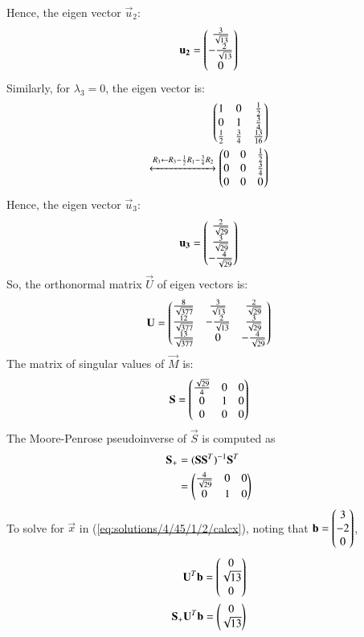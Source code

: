 Hence, the eigen vector $\vec{u}_2$:
\begin{align}
	\mathbf{u_2}= \begin{pmatrix}\frac{3}{\sqrt{13}} \\ -\frac{2}{\sqrt{13}} \\ 0 \end{pmatrix}
\end{align}
Similarly, for $\lambda_3=0$, the eigen vector is:
\begin{align}
	\begin{pmatrix}1 & 0 & \frac{1}{2} \\ 0 & 1 & \frac{3}{4} \\
	\frac{1}{2} & \frac{3}{4} & \frac{13}{16} \end{pmatrix}  \\
	\xleftrightarrow[]{R_3 \leftarrow R_3-\frac{1}{2}R_1-\frac{3}{4}R_2}
	\begin{pmatrix}0 & 0 & \frac{1}{2} \\ 0 & 0 & \frac{3}{4} \\
	0	& 	0	&	0 \end{pmatrix} 
\end{align}
Hence, the eigen vector $\vec{u}_3$:
\begin{align}
	\mathbf{u_3}= \begin{pmatrix}\frac{2}{\sqrt{29}} \\ \frac{3}{\sqrt{29}} \\ 
	-\frac{4}{\sqrt{29}} \end{pmatrix}
\end{align}
So, the orthonormal matrix $\vec{U}$ of eigen vectors is:
\begin{align}
   \mathbf{U}= \begin{pmatrix}
	   \frac{8}{\sqrt{377}} & \frac{3}{\sqrt{13}} & \frac{2}{\sqrt{29}}  \\ 
	   \frac{12}{\sqrt{377}} & -\frac{2}{\sqrt{13}} & \frac{3}{\sqrt{29}}\\ 
	   \frac{13}{\sqrt{377}} & 0 & -\frac{4}{\sqrt{29}} \end{pmatrix}
\end{align}
The matrix of singular values of $\vec{M}$ is: 
\begin{align}
   \mathbf{S}= \begin{pmatrix} \frac{\sqrt{29}}{4} & 0 & 0 \\
	   0 & 1 & 0 \\ 0 & 0 & 0\end{pmatrix}
\end{align}
The Moore-Penrose pseudoinverse of $\vec{S}$ is computed as
\begin{align}
	\mathbf{S}_{+} &= (\mathbf{S}\mathbf{S}^T)^{-1}\mathbf{S}^T 	\\
		&= \begin{pmatrix} \frac{4}{\sqrt{29}} & 0 & 0 \\ 0 & 1 & 0 \end{pmatrix}
\end{align}
To solve for $\vec{x}$ in (\ref{eq:solutions/4/45/1/2/calcx}), noting that $\mathbf{b}=\begin{pmatrix}3 \\ -2 \\ 0\end{pmatrix}$, 
\begin{align}
\mathbf{U}^T\mathbf{b} = \begin{pmatrix}
	0 \\ \sqrt{13} \\ 0 \end{pmatrix} \\
\mathbf{S}_{+}\mathbf{U}^T\mathbf{b} = \begin{pmatrix} 0 \\ \sqrt{13} \end{pmatrix}
\end{align}
